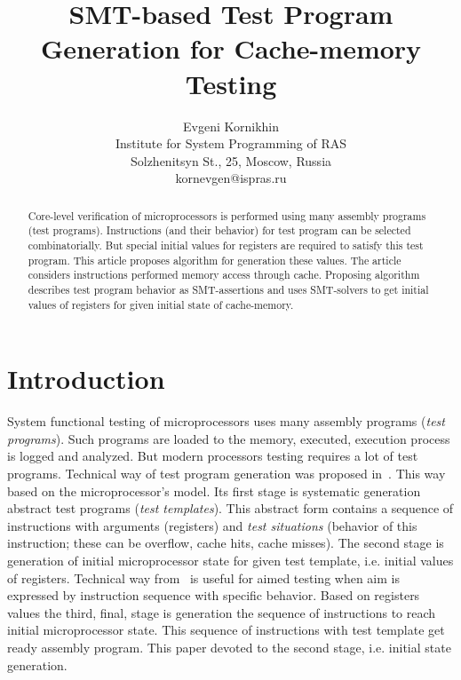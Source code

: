 \documentclass[times, 10pt,twocolumn]{article}
\begin{document}
\title{SMT-based Test Program Generation for Cache-memory Testing}

\author{Evgeni Kornikhin\\
Institute for System Programming of RAS\\ Solzhenitsyn St., 25, Moscow, Russia\\ kornevgen@ispras.ru\\
}

\maketitle
\thispagestyle{empty}

\begin{abstract}
Core-level verification of microprocessors is performed using
many assembly programs (test programs). Instructions (and their behavior) for test program can be selected combinatorially. But special initial values for registers are required to satisfy this test program. This article proposes algorithm for generation these values. The article considers instructions performed memory access through cache. Proposing algorithm describes test program behavior as SMT-assertions and uses SMT-solvers to get initial values of registers for given initial state of cache-memory.
\end{abstract}



\section{Introduction}

System functional testing of microprocessors uses many assembly
programs (\emph{test programs}). Such programs are loaded to the
memory, executed, execution process is logged and analyzed. But
modern processors testing requires a lot of test programs. Technical
way of test program generation was proposed in~\cite{kamkin}. This
way based on the microprocessor's model. Its first stage is
systematic generation abstract test programs (\emph{test
templates}). This abstract form contains a sequence of instructions
with arguments (registers) and \emph{test situations} (behavior of
this instruction; these can be overflow, cache hits, cache misses).
The second stage is generation of initial microprocessor state for
given test template, i.e. initial values of registers. Technical way
from~\cite{kamkin} is useful for aimed testing when aim is expressed
by instruction sequence with specific behavior. Based on registers
values the third, final, stage is generation the sequence of
instructions to reach initial microprocessor state. This sequence of
instructions with test template get ready assembly program. This
paper devoted to the second stage, i.e. initial state generation.
\end{document}
